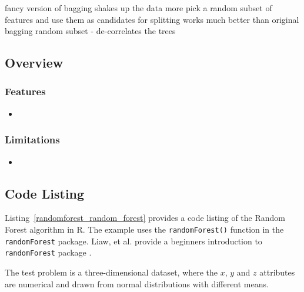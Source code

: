 fancy version of bagging
shakes up the data more
pick a random subset of features and use them as candidates for splitting
works much better than original bagging
random subset - de-correlates the trees



\subsection{Overview}

\subsubsection{Features}

\begin{itemize}
	\item 
\end{itemize}

\subsubsection{Limitations}

\begin{itemize}
	\item 
\end{itemize}


\subsection{Code Listing}
Listing~\ref{randomforest_random_forest} provides a code listing of the Random Forest algorithm in R.
The example uses the \texttt{randomForest()} function in the \texttt{randomForest} package.
Liaw, et al. provide a beginners introduction to \texttt{randomForest} package \cite{Liaw2002}.

The test problem is a three-dimensional dataset, where the $x$, $y$ and $z$ attributes are numerical and drawn from normal distributions with different means. 




